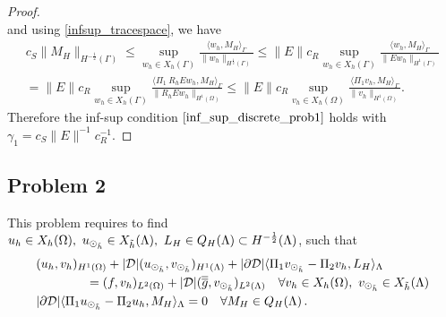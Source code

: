 \begin{proof}
\begin{equation*}
\end{equation*}
and using \eqref{infsup_tracespace}, we have
\begin{multline}
c_S \|M_H\|_{H^{-\frac 12}(\Gamma)} 
\leq 
\sup_{w_h \in X_h(\Gamma)} \frac{ \langle w_h, M_H \rangle_{\Gamma} } {\|w_h\|_{H^{\frac 12}(\Gamma)}} 
\leq
\|E\| c_R \sup_{w_h \in X_h(\Gamma)} \frac{ \langle w_h, M_H \rangle_{\Gamma} } {\|E w_h\|_{H^1(\Gamma)}}
\\
=
\|E\| c_R \sup_{w_h \in X_h(\Gamma)} \frac{ \langle \Pi_1 \ R_h E w_h, M_H \rangle_{\Gamma} } {\|R_h E w_h\|_{H^1(\Omega)}} 
\leq \|E\| c_R \sup_{v_h \in X_h(\Omega)} \frac{ \langle \Pi_1 v_h, M_H \rangle_{\Gamma} } {\|v_h\|_{H^1(\Omega)}}. 
\end{multline}
Therefore the inf-sup condition $\eqref{inf_sup_discrete_prob1}$ holds with $\gamma_1 = c_S\|E\|^{-1} c_R^{-1}$.
\end{proof}


\subsection{Problem 2}
This problem requires to find  $u_h \in X_h(\Omega) ,\ u_{\odot_{\tilde{h}}} \in X_{\tilde{h}}(\Lambda), \ L_H \in Q_H(\Lambda) \subset H^{-\frac12}(\Lambda)$, such that
\begin{subequations}
\begin{align*}
&(u_h,v_h)_{H^1(\Omega)} + |{\cal D}|(\udh,\vdh)_{H^1(\Lambda)} 
+ |\partial {\cal D}| \langle  \Pi_1 \vdh - \Pi_2 v_h, L_H \rangle_\Lambda 
\\
\nonumber
&\qquad\qquad= (f,v_h)_{L^2(\Omega)} + |{\cal D}| (\avrd{g},\vdh)_{L^2(\Lambda)}
\quad \forall v_h \in X_h(\Omega), \ \vdh \in X_{\tilde{h}}(\Lambda)
\\
&  |\partial {\cal D}| \langle \Pi_1 \udh - \Pi_2 u_h, M_H \rangle_\Lambda = 0
\quad \forall M_H \in Q_H(\Lambda)\,.
\end{align*}
\end{subequations}


